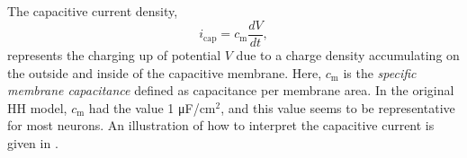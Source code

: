 \subsection{}
\label{sec:Neuron:Cap}
The capacitive current density,
\begin{equation}
i_{\mathrm{cap}}= c_{\mathrm{m}} \frac{dV}{dt},
\label{eq:Neuron:HHcap}
\end{equation}
represents the charging up of  potential $V$ due to a charge density accumulating on the outside and inside of the capacitive membrane. 
  
Here, $c_{\mathrm{m}}$ is the \textit{specific membrane capacitance} defined as capacitance per membrane area. In the original HH model, $c_{\mathrm{m}}$ had the value 1 \si{\micro \farad / \cm}$^2$, and this value seems to be representative for most neurons.  An illustration of how to interpret the capacitive current is given in . 

